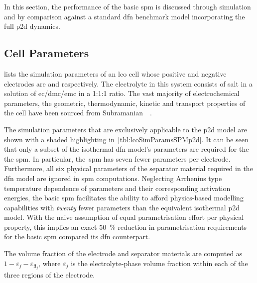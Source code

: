 
In this  section, the performance  of the  basic \gls{spm} is  discussed through
simulation  and  by comparison  against  a  standard \gls{dfn}  benchmark  model
incorporating the full \gls{p2d} dynamics.

\subsection{Cell Parameters}


 lists  the simulation  parameters of  an \gls{lco}
cell  whose positive  and negative  electrodes are   and  
respectively.  The  electrolyte in  this  system  consists of    salt
in  a  solution of  \gls{ec}/\gls{dmc}/\gls{emc}  in  a  1:1:1 ratio.  The  vast
majority  of electrochemical  parameters, \viz{}  the geometric,  thermodynamic,
kinetic  and   transport  properties  of   the  cell  have  been   sourced  from
Subramanian~\etal{}~\cite{Subramanian2009}.

The simulation parameters that are exclusively applicable to the \gls{p2d} model
are shown with a shaded highlighting in~\cref{tbl:lcoSimParamsSPMp2d}. It can be
seen  that only  a subset  of the  isothermal \gls{dfn}  model's parameters  are
required for  the the  \gls{spm}. In particular,  the~\gls{spm} has  seven fewer
parameters  per  electrode. Furthermore,  all  six  physical parameters  of  the
separator  material required  in the  \gls{dfn} model  are ignored  in \gls{spm}
computations. Neglecting Arrhenius type temperature dependence of parameters and
their  corresponding activation  energies, the  basic \gls{spm}  facilitates the
ability to afford physics-based  modelling capabilities with \emph{twenty} fewer
parameters  than  the equivalent  isothermal  \gls{p2d}  model. With  the  naive
assumption of equal  parametrisation effort per physical  property, this implies
an  exact \SI{50}{\percent}  reduction in  parametrisation requirements  for the
basic \gls{spm} compared its \gls{dfn} counterpart.


The volume  fraction of the electrode and separator
materials are computed as $1 - \varepsilon_j - \varepsilon_{\text{fi}_j}$, where
$\varepsilon_j$  is the  electrolyte-phase volume  fraction within  each of  the
three regions of the electrode.

